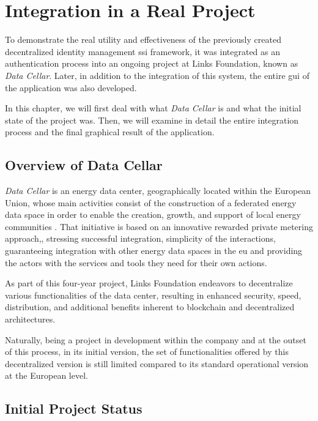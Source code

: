 \chapter{Integration in a Real Project} \label{ch:integration}

To demonstrate the real utility and effectiveness of the previously created decentralized identity management \gls{ssi} framework, it was integrated as an authentication process 
into an ongoing project at Links Foundation, known as \textit{Data Cellar}. Later, in addition to the integration of this system, the entire \gls{gui} of the application was also developed.

In this chapter, we will first deal with what \textit{Data Cellar} is and what the initial state of the project was. Then, we will examine in detail the entire integration process 
and the final graphical result of the application.

\section{Overview of Data Cellar}

\textit{Data Cellar} is an energy data center, geographically located within the European Union, whose main activities consist of the construction of a federated energy data space in 
order to enable the creation, growth, and support of local energy communities \cite{datacellarproject}. That initiative is based on an innovative rewarded private metering approach,, stressing 
successful integration, simplicity of the interactions, guaranteeing integration with other energy data spaces in the \gls{eu} and providing the actors with the services and tools
they need for their own actions.

As part of this four-year project, Links Foundation endeavors to decentralize various functionalities of the data center, resulting in enhanced security, speed, 
distribution, and additional benefits inherent to blockchain and decentralized architectures.

Naturally, being a project in development within the company and at the outset of this process, in its initial version, the set of functionalities offered by this 
decentralized version is still limited compared to its standard operational version at the European level.

\section{Initial Project Status}


